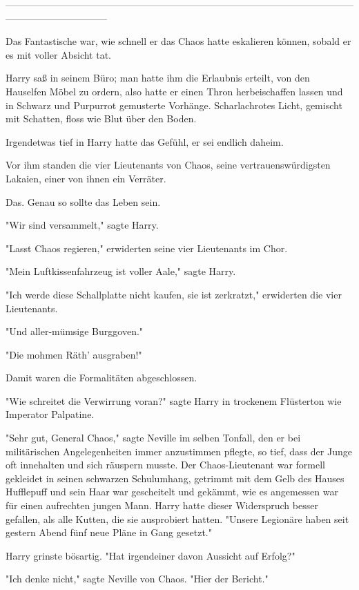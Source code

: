 {--------------------------------------------------------------------------------------------------------------------------------------------

Das Fantastische war, wie schnell er das Chaos hatte eskalieren können, sobald er es mit voller Absicht tat.

Harry saß in seinem Büro; man hatte ihm die Erlaubnis erteilt, von den Hauselfen Möbel zu ordern, also hatte er einen Thron herbeischaffen lassen und in Schwarz und Purpurrot gemusterte Vorhänge. Scharlachrotes Licht, gemischt mit Schatten, floss wie Blut über den Boden.

Irgendetwas tief in Harry hatte das Gefühl, er sei endlich daheim.

Vor ihm standen die vier Lieutenants von Chaos, seine vertrauenswürdigsten Lakaien, einer von ihnen ein Verräter.

Das. Genau so sollte das Leben sein.

"Wir sind versammelt," sagte Harry.

"Lasst Chaos regieren," erwiderten seine vier Lieutenants im Chor.

"Mein Luftkissenfahrzeug ist voller Aale," sagte Harry.

"Ich werde diese Schallplatte nicht kaufen, sie ist zerkratzt," erwiderten die vier Lieutenants.

"Und aller-mümsige Burggoven."

"Die mohmen Räth' ausgraben!"

Damit waren die Formalitäten abgeschlossen.

"Wie schreitet die Verwirrung voran?" sagte Harry in trockenem Flüsterton wie Imperator Palpatine.

"Sehr gut, General Chaos," sagte Neville im selben Tonfall, den er bei militärischen Angelegenheiten immer anzustimmen pflegte, so tief, dass der Junge oft innehalten und sich räuspern musste. Der Chaos-Lieutenant war formell gekleidet in seinen schwarzen Schulumhang, getrimmt mit dem Gelb des Hauses Hufflepuff und sein Haar war gescheitelt und gekämmt, wie es angemessen war für einen aufrechten jungen Mann. Harry hatte dieser Widerspruch besser gefallen, als alle Kutten, die sie ausprobiert hatten. "Unsere Legionäre haben seit gestern Abend fünf neue Pläne in Gang gesetzt."

Harry grinste bösartig. "Hat irgendeiner davon Aussicht auf Erfolg?"

"Ich denke nicht," sagte Neville von Chaos. "Hier der Bericht."

}

